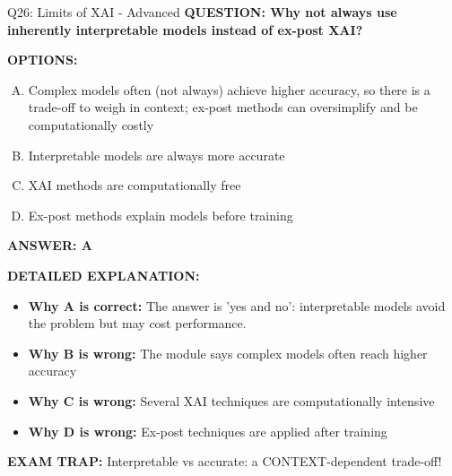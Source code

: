 \documentclass[8pt]{beamer}
\begin{document}
\begin{frame}[shrink=6]{Q26: Limits of XAI - Advanced}
\fontsize{6.5}{7.5}\selectfont
\textbf{QUESTION: Why not always use inherently interpretable models instead of ex-post XAI?}

\vspace{0.1cm}
\textbf{OPTIONS:}
\begin{enumerate}[A.]
\item Complex models often (not always) achieve higher accuracy, so there is a trade-off to weigh in context; ex-post methods can oversimplify and be computationally costly
\item Interpretable models are always more accurate
\item XAI methods are computationally free
\item Ex-post methods explain models before training
\end{enumerate}

\vspace{0.1cm}
\textcolor{myblue}{\textbf{ANSWER: A}}

\vspace{0.1cm}
\textbf{DETAILED EXPLANATION:}
\begin{itemize}
\item \textbf{Why A is correct:} The answer is 'yes and no': interpretable models avoid the problem but may cost performance.
\item \textbf{Why B is wrong:} The module says complex models often reach higher accuracy
\item \textbf{Why C is wrong:} Several XAI techniques are computationally intensive
\item \textbf{Why D is wrong:} Ex-post techniques are applied after training
\end{itemize}

\textcolor{myred}{\textbf{EXAM TRAP:}} Interpretable vs accurate: a CONTEXT-dependent trade-off!
\end{frame}
\end{document}
